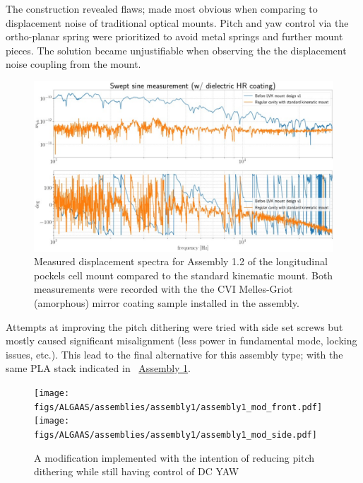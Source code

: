 The construction revealed flaws; made most obvious when comparing to displacement noise of traditional optical mounts. Pitch and yaw control via the ortho-planar spring were prioritized to avoid metal springs and further mount pieces. The solution became unjustifiable when observing the the displacement noise coupling from the mount.


\begin{figure}[H]
\centering
\includegraphics[width=\textwidth]{figs/ALGAAS/assemblies/assembly1/assembly1_2_compare_standmount.pdf}
\caption{Measured displacement spectra for Assembly 1.2 of the longitudinal pockels cell mount compared to the standard kinematic mount. Both measurements were recorded with the the CVI Melles-Griot (amorphous) mirror coating sample installed in the assembly.}
\label{fig:assembly2_compare_kinematic_mount}
\end{figure}


Attempts at improving the pitch dithering were tried with side set screws but mostly caused significant misalignment (less power in fundamental mode, locking issues, etc.). This lead to the final alternative for this assembly type; with the same PLA stack indicated in ~\hyperref[fig:A1pt0]{Assembly 1}.

\begin{figure}[!ht]
	\begin{subcaptiongroup}
		\texttt{[image: figs/ALGAAS/assemblies/assembly1/assembly1\_mod\_front.pdf]}
		\label{A1_front}
		\texttt{[image: figs/ALGAAS/assemblies/assembly1/assembly1\_mod\_side.pdf]}
		\label{A1_side}
	\end{subcaptiongroup}
    \caption{A modification implemented  with the intention of reducing pitch dithering while still having control of DC YAW}
    \label{fig:A1pt0mod}
\end{figure}

